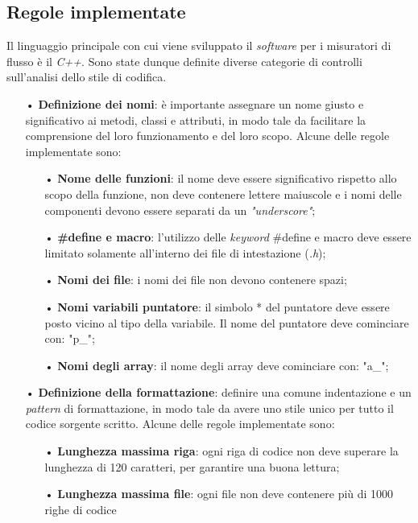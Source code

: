 \subsection{Regole implementate}
Il linguaggio principale con cui viene sviluppato il \textit{software} per i misuratori di flusso è il \textit{C++}. Sono state dunque definite diverse categorie di controlli sull'analisi dello stile di codifica.

\begin{itemize}
\item[•] \textbf{Definizione dei nomi}: è importante assegnare un nome giusto e significativo ai metodi, classi e attributi, in modo tale da facilitare la comprensione del loro funzionamento e del loro scopo. Alcune delle regole implementate sono:
\begin{itemize}
\item[•] \textbf{Nome delle funzioni}: il nome deve essere significativo rispetto allo scopo della funzione, non deve contenere lettere maiuscole e i nomi delle componenti devono essere separati da un \textit{"underscore"};

\item[•] \textbf{\#define e macro}: l'utilizzo delle \textit{keyword} \#define e macro deve essere limitato solamente all'interno dei file di intestazione (\textit{.h});

\item[•] \textbf{Nomi dei file}: i nomi dei file non devono contenere spazi;

\item[•] \textbf{Nomi variabili puntatore}: il simbolo * del puntatore deve essere posto vicino al tipo della variabile. Il nome del puntatore deve cominciare con: "p\_";

\item[•] \textbf{Nomi degli array}: il nome degli array deve cominciare con: "a\_";
\end{itemize}

\item[•] \textbf{Definizione della formattazione}: definire una comune indentazione e un \textit{pattern} di formattazione, in modo tale da avere uno stile unico per tutto il codice sorgente scritto. Alcune delle regole implementate sono:
\begin{itemize}
\item[•] \textbf{Lunghezza massima riga}: ogni riga di codice non deve superare la lunghezza di 120 caratteri, per garantire una buona lettura;

\item[•] \textbf{Lunghezza massima file}: ogni file non deve contenere più di 1000 righe di codice


\end{itemize}
\end{itemize}
